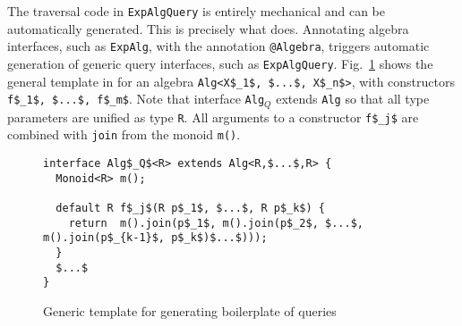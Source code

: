 
The traversal code in \lstinline{ExpAlgQuery} is entirely
mechanical and can be automatically generated.  This is precisely what
\name does. Annotating algebra interfaces, such as \lstinline{ExpAlg}, with the annotation \lstinline{@Algebra},
triggers automatic generation of generic query interfaces, such as \lstinline{ExpAlgQuery}. 
Fig.~\ref{queryTemplate} shows the general template in \name for an algebra \lstinline[mathescape=true]{Alg<X$_1$, $...$, X$_n$>}, with constructors \lstinline[mathescape=true]{f$_1$, $...$, f$_m$}.
Note that interface \lstinline{Alg}$_Q$ extends \lstinline{Alg} so that all type parameters are unified as type \lstinline{R}.
All arguments to a constructor \lstinline[mathescape=true]{f$_j$} are combined with \lstinline{join} from the monoid \lstinline{m()}.

\begin{figure}[t]
\begin{lstlisting}[mathescape=true]
interface Alg$_Q$<R> extends Alg<R,$...$,R> {
  Monoid<R> m();

  default R f$_j$(R p$_1$, $...$, R p$_k$) {
    return  m().join(p$_1$, m().join(p$_2$, $...$, m().join(p$_{k-1}$, p$_k$)$...$)));
  }
  $...$
}
\end{lstlisting}
\caption{Generic template for generating boilerplate of queries}
\label{queryTemplate}
\end{figure}

